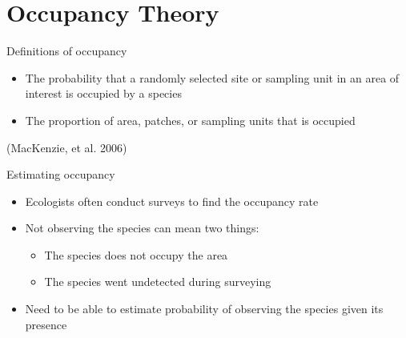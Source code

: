 \documentclass{beamer}
\begin{document}
\section{Occupancy Theory}
\begin{frame}{Definitions of occupancy}
	\begin{itemize}
		\item The probability that a randomly selected site or sampling unit in
		an area of interest is occupied by a species
		\item The proportion of area, patches, or sampling units that is
		occupied
	\end{itemize}
	(MacKenzie, et al. 2006)
	\begin{center}
	\end{center}
\end{frame}

\begin{frame}{Estimating occupancy}
	\begin{itemize}
		\item Ecologists often conduct surveys to find the occupancy rate
		\item Not observing the species can mean two things:
		\begin{itemize}
			\item The species does not occupy the area
			\item The species went undetected during surveying
		\end{itemize}
		\item Need to be able to estimate probability of observing the species
		given its presence
	\end{itemize}
\end{frame}
\end{document}
